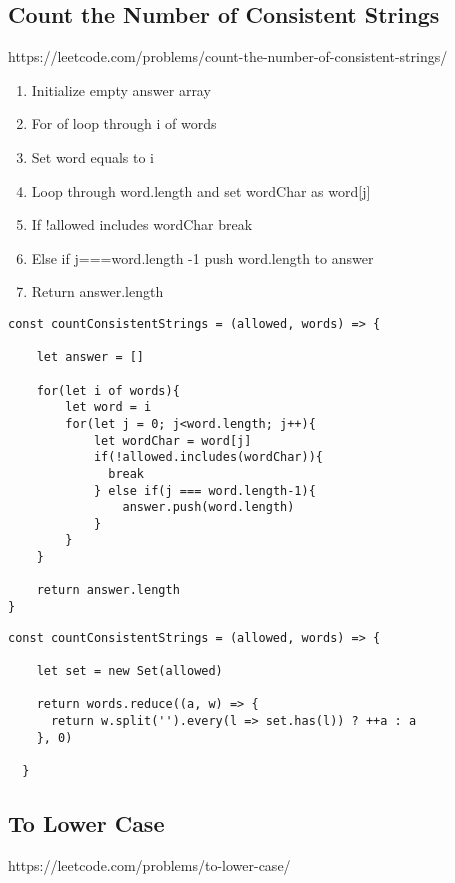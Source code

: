 \documentclass[10pt]{article}
\begin{document}
\pagebreak %
\medskip 
\subsection{Count the Number of Consistent Strings}
https://leetcode.com/problems/count-the-number-of-consistent-strings/

\begin{enumerate}
	\item Initialize empty answer array 
	\item For of loop through i of words
	\item Set word equals to i 
	\item Loop through word.length and set wordChar as word[j]
	\item If !allowed includes wordChar break
	\item Else if j===word.length -1 push word.length to answer
	\item Return answer.length
\end{enumerate}

\begin{lstlisting}[title=Solution countConsistentStrings with loops, captionpos=t]
const countConsistentStrings = (allowed, words) => {
    
    let answer = []
    
    for(let i of words){
        let word = i
        for(let j = 0; j<word.length; j++){
            let wordChar = word[j]
            if(!allowed.includes(wordChar)){
              break
            } else if(j === word.length-1){
                answer.push(word.length)
            }
        }
    }
    
    return answer.length
}
\end{lstlisting}

\begin{lstlisting}[title=Solution countConsistentStrings ES6, captionpos=t]
const countConsistentStrings = (allowed, words) => {

    let set = new Set(allowed)
    
    return words.reduce((a, w) => {
      return w.split('').every(l => set.has(l)) ? ++a : a
    }, 0)
    
  }
\end{lstlisting}
\medskip %





\pagebreak %
\medskip 
\subsection{To Lower Case}
https://leetcode.com/problems/to-lower-case/
\end{document}
